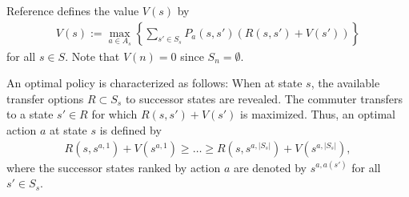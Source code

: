 \documentclass[dissertation,draft*]{aaltoseries}
\newtheorem{theorem}{Theorem}
\begin{document}
Reference \cite{bellman} defines the value $V(s)$ by 
\begin{align}
\label{value}
V(s) := \max_{a \in A_s} \left\{ \sum_{s' \in S_s} P_a(s,s') \left(R(s,s') +V(s')\right)\right\}
\end{align}
for all $s \in S$. Note that $V(n)=0$ since $S_n = \emptyset$.

An optimal policy is characterized as follows:
When at state $s$, the available transfer options $R \subset S_s$ to successor states are revealed.
The commuter transfers to a state $s' \in R$ for which $R(s,s') +V(s')$ is maximized.
Thus, an optimal action $a$ at state $s$ is defined by %
\begin{align}
\label{jarjestys}
R(s,s^{a,1})+V(s^{a,1}) \geq \ldots \geq R(s,s^{a,|S_s|})+V(s^{a,|S_s|}),
\end{align}
where the successor states ranked by action $a$ are denoted by $s^{a,a(s')}$ for all $s' \in S_s$.
\end{document}
